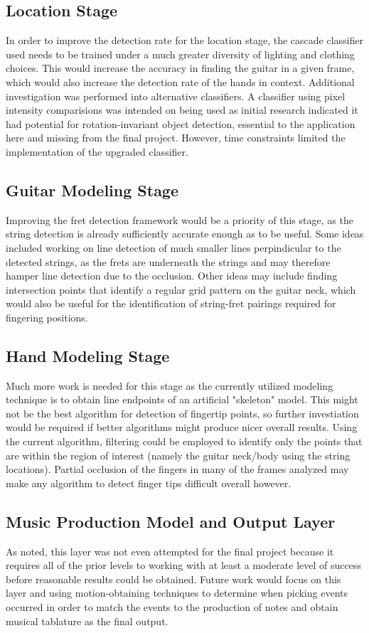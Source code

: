 \subsection{Location Stage}
In order to improve the detection rate for the location stage, the cascade classifier used needs to be
trained under a much greater diversity of lighting and clothing choices. This would increase the accuracy in
finding the guitar in a given frame, which would also increase the detection rate of the hands in context.
Additional investigation was performed into alternative classifiers. A classifier using pixel intensity
comparisions \cite{pico} was intended on being used as initial research indicated it had potential for
rotation-invariant object detection, essential to the application here and missing from the final
project. However, time constraints limited the implementation of the upgraded classifier.

\subsection{Guitar Modeling Stage}
Improving the fret detection framework would be a priority of this stage, as the string detection is already
sufficiently accurate enough as to be useful. Some ideas included working on line detection of much smaller
lines perpindicular to the detected strings, as the frets are underneath the strings and may therefore 
hamper line detection due to the occlusion. Other ideas may include finding intersection points that identify
a regular grid pattern on the guitar neck, which would also be useful for the identification of string-fret
pairings required for fingering positions.

\subsection{Hand Modeling Stage}
Much more work is needed for this stage as the currently utilized modeling technique is to obtain line
endpoints of an artificial "skeleton" model. This might not be the best algorithm for detection of fingertip
points, so further investiation would be required if better algorithms might produce nicer overall results.
Using the current algorithm, filtering could be employed to identify only the points that are within the region
of interest (namely the guitar neck/body using the string locations). Partial occlusion of the fingers in
many of the frames analyzed may make any algorithm to detect finger tips difficult overall however.

\subsection{Music Production Model and Output Layer}
As noted, this layer was not even attempted for the final project because it requires all of the prior
levels to working with at least a moderate level of success before reasonable results could be obtained.
Future work would focus on this layer and using motion-obtaining techniques to determine when picking
events occurred in order to match the events to the production of notes and obtain musical tablature as
the final output.

